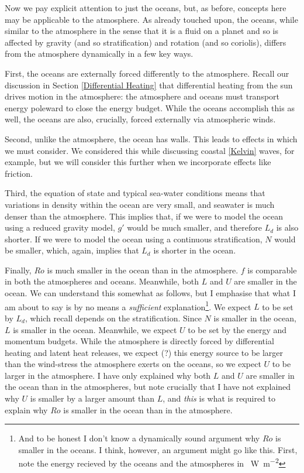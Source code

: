 Now we pay explicit attention to just the oceans, but, as before, concepts here may be applicable to the atmosphere. As already touched upon, the oceans, while similar to the atmosphere in the sense that it is a fluid on a planet and so is affected by gravity (and so stratification) and rotation (and so coriolis), differs from the atmosphere dynamically in a few key ways.

First, the oceans are externally forced differently to the atmosphere. Recall our discussion in Section \ref{Differential Heating} that differential heating from the sun drives motion in the atmosphere: the atmosphere and oceans must transport energy poleward to close the energy budget. While the oceans accomplish this as well, the oceans are also, crucially, forced externally via atmospheric winds.

Second, unlike the atmosphere, the ocean has walls. This leads to effects in which we must consider. We considered this while discussing coastal \ref{Kelvin} waves, for example, but we will consider this further when we incorporate effects like friction.

Third, the equation of state and typical sea-water conditions means that variations in density within the ocean are very small, and seawater is much denser than the atmosphere. This implies that, if we were to model the ocean using a reduced gravity model, $g'$ would be much smaller, and therefore $L_d$ is also shorter. If we were to model the ocean using a continuous stratification, $N$ would be smaller, which, again, implies that $L_d$ is shorter in the ocean.

Finally, $Ro$ is much smaller in the ocean than in the atmosphere. $f$ is comparable in both the atmospheres and oceans. Meanwhile, both $L$ and $U$ are smaller in the ocean. We can understand this somewhat as follows, but I emphasise that what I am about to say is by no means a \textit{sufficient} explanation\footnote{And to be honest I don't know a dynamically sound argument why $Ro$ is smaller in the oceans. I think, however, an argument might go like this. First, note the energy recieved by the oceans and the atmospheres in \qty{}{\watt\per\square\meter}}. We expect $L$ to be set by $L_d$, which recall depends on the stratification. Since $N$ is smaller in the ocean, $L$ is smaller in the ocean. Meanwhile, we expect $U$ to be set by the energy and momentum budgets. While the atmosphere is directly forced by differential heating and latent heat releases, we expect (?) this energy source to be larger than the wind-stress the atmosphere exerts on the oceans, so we expect $U$ to be larger in the atmosphere. I have only explained why both $L$ and $U$ are smaller in the ocean than in the atmospheres, but note crucially that I have not explained why $U$ is smaller by a larger amount than $L$, and \textit{this} is what is required to explain why $Ro$ is smaller in the ocean than in the atmosphere.

